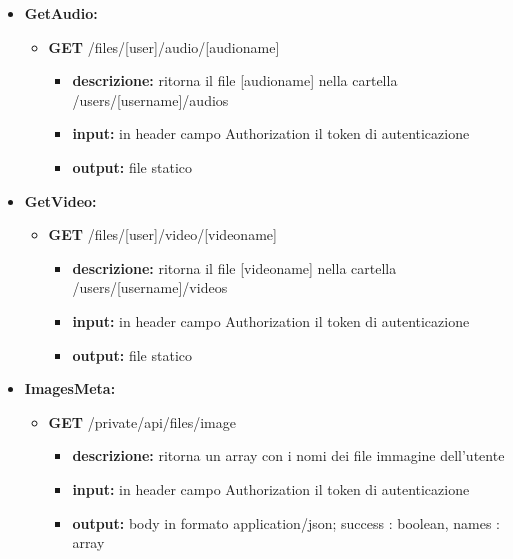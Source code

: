 {{\begin{itemize}
		\item \textbf{GetAudio:}
			\begin{itemize}
			\item    \textbf{GET} /files/[user]/audio/[audioname]
				\begin{itemize} 
				\item \textbf{descrizione:} ritorna il file [audioname] nella cartella /users/[username]/audios
				\item \textbf{input:} in header campo Authorization il token di autenticazione
				\item \textbf{output:} file statico
				\end{itemize}		
			\end{itemize}
			
		\item \textbf{GetVideo:}
			\begin{itemize}
			\item    \textbf{GET} /files/[user]/video/[videoname]
				\begin{itemize} 
				\item \textbf{descrizione:} ritorna il file [videoname] nella cartella /users/[username]/videos					\item \textbf{input:} in header campo Authorization il token di autenticazione
				\item \textbf{output:} file statico
				\end{itemize}
			\end{itemize}
			
			
		\item \textbf{ImagesMeta:}
			\begin{itemize}
			\item   \textbf{GET} /private/api/files/image 
				\begin{itemize} 
				\item \textbf{descrizione:} ritorna un array con i nomi dei file immagine dell'utente
				\item \textbf{input:} in header campo Authorization il token di autenticazione
				\item \textbf{output:} body in formato application/json; success : boolean, names : array
				\end{itemize}
			\end{itemize}
			

\end{itemize}}}
